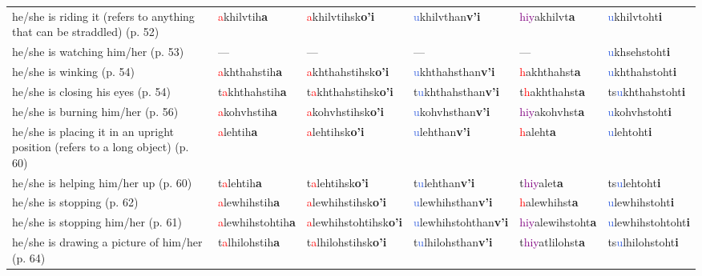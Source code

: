 \documentclass[oneside,openany]{book}%
\begin{document}
\begin{tabularx}{\textwidth}{>{\hsize=1.5\hsize\RaggedRight}X >{\hsize=0.9\hsize}X >{\hsize=0.9\hsize}X >{\hsize=0.9\hsize}X >{\hsize=0.9\hsize}X >{\hsize=0.9\hsize}X}
he/she is riding it (refers to anything that can be straddled) (p. 52)&\textcolor{Red}{a}khilvtih\textbf{a}&\textcolor{Red}{a}khilvtihsk\textbf{o'i}&\textcolor{RoyalBlue}{u}khilvthan\textbf{v'i}&\textcolor{Purple}{hiy}akhilvt\textbf{a}&\textcolor{RoyalBlue}{u}khilvtoht\textbf{i}\\%
he/she is watching him/her (p. 53)&---&---&---&---&\textcolor{RoyalBlue}{u}khsehstoht\textbf{i}\\%
he/she is winking (p. 54)&\textcolor{Red}{a}khthahstih\textbf{a}&\textcolor{Red}{a}khthahstihsk\textbf{o'i}&\textcolor{RoyalBlue}{u}khthahsthan\textbf{v'i}&\textcolor{Red}{h}akhthahst\textbf{a}&\textcolor{RoyalBlue}{u}khthahstoht\textbf{i}\\%
he/she is closing his eyes (p. 54)&t\textcolor{Red}{a}khthahstih\textbf{a}&t\textcolor{Red}{a}khthahstihsk\textbf{o'i}&t\textcolor{RoyalBlue}{u}khthahsthan\textbf{v'i}&t\textcolor{Red}{h}akhthahst\textbf{a}&ts\textcolor{RoyalBlue}{u}khthahstoht\textbf{i}\\%
he/she is burning him/her (p. 56)&\textcolor{Red}{a}kohvhstih\textbf{a}&\textcolor{Red}{a}kohvhstihsk\textbf{o'i}&\textcolor{RoyalBlue}{u}kohvhsthan\textbf{v'i}&\textcolor{Purple}{hiy}akohvhst\textbf{a}&\textcolor{RoyalBlue}{u}kohvhstoht\textbf{i}\\%
he/she is placing it in an upright position (refers to a long object) (p. 60)&\textcolor{Red}{a}lehtih\textbf{a}&\textcolor{Red}{a}lehtihsk\textbf{o'i}&\textcolor{RoyalBlue}{u}lehthan\textbf{v'i}&\textcolor{Red}{h}aleht\textbf{a}&\textcolor{RoyalBlue}{u}lehtoht\textbf{i}\\%
he/she is helping him/her up (p. 60)&t\textcolor{Red}{a}lehtih\textbf{a}&t\textcolor{Red}{a}lehtihsk\textbf{o'i}&t\textcolor{RoyalBlue}{u}lehthan\textbf{v'i}&t\textcolor{Purple}{hiy}alet\textbf{a}&ts\textcolor{RoyalBlue}{u}lehtoht\textbf{i}\\%
he/she is stopping (p. 62)&\textcolor{Red}{a}lewhihstih\textbf{a}&\textcolor{Red}{a}lewhihstihsk\textbf{o'i}&\textcolor{RoyalBlue}{u}lewhihsthan\textbf{v'i}&\textcolor{Red}{h}alewhihst\textbf{a}&\textcolor{RoyalBlue}{u}lewhihstoht\textbf{i}\\%
he/she is stopping him/her (p. 61)&\textcolor{Red}{a}lewhihstohtih\textbf{a}&\textcolor{Red}{a}lewhihstohtihsk\textbf{o'i}&\textcolor{RoyalBlue}{u}lewhihstohthan\textbf{v'i}&\textcolor{Purple}{hiy}alewihstoht\textbf{a}&\textcolor{RoyalBlue}{u}lewhihstohtoht\textbf{i}\\%
he/she is drawing a picture of him/her (p. 64)&t\textcolor{Red}{a}lhilohstih\textbf{a}&t\textcolor{Red}{a}lhilohstihsk\textbf{o'i}&t\textcolor{RoyalBlue}{u}lhilohsthan\textbf{v'i}&t\textcolor{Purple}{hiy}atlilohst\textbf{a}&ts\textcolor{RoyalBlue}{u}lhilohstoht\textbf{i}\\%

\end{tabularx}
\end{document}
